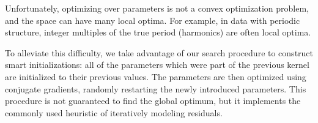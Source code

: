 \documentclass[twoside]{article}
\renewcommand{\TBD}[1]{}
\begin{document}
Unfortunately, optimizing over parameters is not a convex optimization problem, and the space can have many local optima.
For example, in data with periodic structure, integer multiples of the true period (\ie harmonics) are often local optima. 

To alleviate this difficulty, we take advantage of our search procedure to construct smart initializations: all of the parameters which were part of the previous kernel are initialized to their previous values.
The parameters are then optimized using conjugate gradients, randomly restarting the newly introduced parameters.
This procedure is not guaranteed to find the global optimum, but it implements the commonly used heuristic of iteratively modeling residuals.


\end{document}
